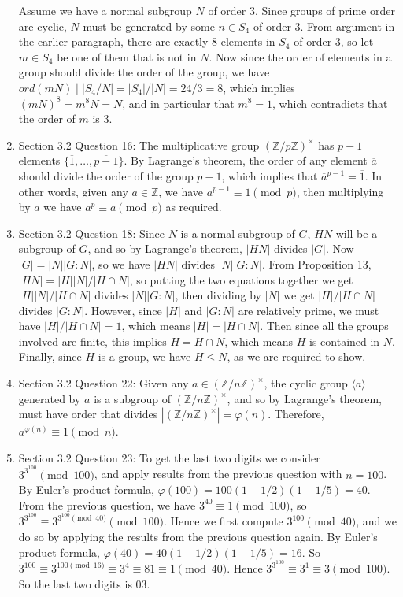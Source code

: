 \documentclass{article}
\begin{document}
\begin{enumerate}
    Assume we have a normal subgroup $N$ of order 3. Since groups of prime
    order are cyclic, $N$ must be generated by some $n\in S_4$ of order 3.
    From argument in the earlier paragraph, there are exactly 8 elements in
    $S_4$ of order 3, so let $m\in S_4$ be one of them that is not in $N$.
    Now since the order of elements in a group should divide the order of
    the group, we have $ord(mN)\mid|S_4/N|=|S_4|/|N|=24/3=8$, which
    implies $(mN)^8=m^8N=N$, and in particular that $m^8=1$, which
    contradicts that the order of $m$ is 3.

  \item Section 3.2 Question 16: The multiplicative group
    $(\mathbb{Z}/p\mathbb{Z})^\times$ has $p-1$ elements
    $\{\overline{1},\ldots,\overline{p-1}\}$. By Lagrange's theorem, the
    order of any element $\overline{a}$ should divide the order of the
    group $p-1$, which implies that $\overline{a}^{p-1}=\overline{1}$. In
    other words, given any $a\in\mathbb{Z}$, we have $a^{p-1} \equiv
    1\pmod{p}$, then multiplying by $a$ we have $a^p \equiv a\pmod{p}$ as
    required.

  \item Section 3.2 Question 18: Since $N$ is a normal subgroup of $G$,
    $HN$ will be a subgroup of $G$, and so by Lagrange's theorem, $|HN|$
    divides $|G|$. Now $|G|=|N||G:N|$, so we have $|HN|$ divides
    $|N||G:N|$. From Proposition 13, $|HN|=|H||N|/|H\cap N|$, so putting
    the two equations together we get $|H||N|/|H\cap N|$ divides
    $|N||G:N|$, then dividing by $|N|$ we get $|H|/|H\cap N|$ divides
    $|G:N|$. However, since $|H|$ and $|G:N|$ are relatively prime, we must
    have $|H|/|H\cap N|=1$, which means $|H|=|H\cap N|$. Then since all the
    groups involved are finite, this implies $H=H\cap N$, which means $H$
    is contained in $N$. Finally, since $H$ is a group, we have $H\leq N$,
    as we are required to show.

  \item Section 3.2 Question 22: Given any
    $a\in(\mathbb{Z}/n\mathbb{Z})^\times$, the cyclic group $\langle
    a\rangle$ generated by $a$ is a subgroup of
    $(\mathbb{Z}/n\mathbb{Z})^\times$, and so by Lagrange's theorem, must
    have order that divides $|(\mathbb{Z}/n\mathbb{Z})^\times|=\varphi(n)$.
    Therefore, $a^{\varphi(n)}\equiv 1\pmod{n}$.

  \item Section 3.2 Question 23: To get the last two digits we consider
    $3^{3^{100}}\pmod{100}$, and apply results from the previous question
    with $n=100$. By Euler's product formula,
    $\varphi(100)=100(1-1/2)(1-1/5)=40$. From the previous question, we
    have $3^{40}\equiv1\pmod{100}$, so
    $3^{3^{100}}\equiv3^{3^{100}\pmod{40}}\pmod{100}$. Hence we first
    compute $3^{100}\pmod{40}$, and we do so by applying the results from
    the previous question again. By Euler's product formula,
    $\varphi(40)=40(1-1/2)(1-1/5)=16$. So
    $3^{100}\equiv3^{100\pmod{16}}\equiv3^4\equiv81\equiv1\pmod{40}$. Hence
    $3^{3^{100}}\equiv3^{1}\equiv3\pmod{100}$. So the last two digits is
    03.


\end{enumerate}
\end{document}
